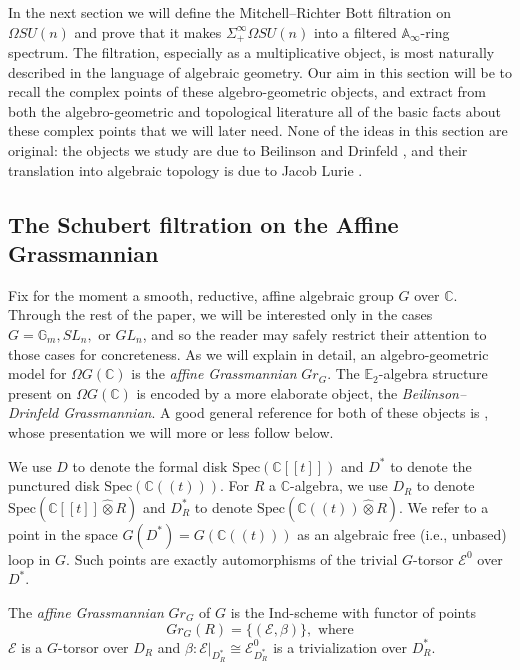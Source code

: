 

In the next section we will define the Mitchell--Richter Bott filtration on $\Omega SU(n)$ and prove that it makes $\Sigma^{\infty}_+ \Omega SU(n)$ into a filtered $\mathbb{A}_\infty$-ring spectrum.  The filtration, especially as a multiplicative object, is most naturally described in the language of algebraic geometry.  Our aim in this section will be to recall the complex points of these algebro-geometric objects, and extract from both the algebro-geometric and topological literature all of the basic facts about these complex points that we will later need.  None of the ideas in this section are original: the objects we study are due to Beilinson and Drinfeld \cite{BDQuantization}, and their translation into algebraic topology is due to Jacob Lurie  \cite[\S 5.5]{HA}.

\subsection{The Schubert filtration on the Affine Grassmannian}

Fix for the moment a smooth, reductive, affine algebraic group $G$ over $\mathbb{C}$.  Through the rest of the paper, we will be interested only in the cases $G=\mathbb{G}_m,SL_n,$ or $GL_n$, and so the reader may safely restrict their attention to those cases for concreteness.  As we will explain in detail, an algebro-geometric model for $\Omega G(\mathbb{C})$ is the \textit{affine Grassmannian} $Gr_G$.  The $\mathbb{E}_2$-algebra structure present on $\Omega G(\mathbb{C})$ is encoded by a more elaborate object, the \textit{Beilinson--Drinfeld Grassmannian}.  A good general reference for both of these objects is \cite{Zhu}, whose presentation we will more or less follow below.

We use $D$ to denote the formal disk $\text{Spec}(\mathbb{C}[[t]])$ and $D^*$ to denote the punctured disk $\text{Spec}(\mathbb{C}((t)))$.  For $R$ a $\mathbb{C}$-algebra, we use $D_R$ to denote $\text{Spec}(\mathbb{C}[[t]] \hat{\otimes} R)$ and $D^*_R$ to denote $\text{Spec}(\mathbb{C}((t)) \hat{\otimes} R)$.  We refer to a point in the space $G(D^*)=G(\mathbb{C}((t)))$ as an algebraic free (i.e., unbased) loop in $G$.  Such points are exactly automorphisms of the trivial $G$-torsor $\mathcal{E}^0$ over $D^*$.

\begin{dfn}
The \textit{affine Grassmannian} $Gr_G$ of $G$ is the Ind-scheme with functor of points
$$Gr_G(R) = \{(\mathcal{E},\beta)\},\text{ where}$$
$\mathcal{E}$ is a $G$-torsor over $D_{R}$ and $\beta:\mathcal{E}|_{D^*_{R}} \cong \mathcal{E}^0_{D^*_{R}}$ is a trivialization over $D^*_{R}$.
\end{dfn}


